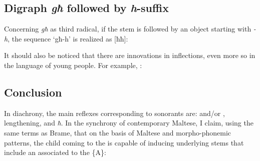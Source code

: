 \documentclass[output=paper]{langsci/langscibook}
\begin{document}
\subsection{Digraph \textit{għ} followed by \textit{h}-suffix}

Concerning \textit{għ} as third radical, if the stem is followed by an object  starting with \textit{-h}, the sequence ‘għ-h’ is realized as [ħħ]:

\ea%
\begin{xlist}
\vspace*{-5mm}
\end{xlist}
\z

It should also be noticed that there are innovations in inflections, even more so in the language of young people. For example, \citet[99]{Fabri2011}:


\puechlengths{1cm}{2cm}{4cm}{3.5cm}{1.5cm}{1.5cm}

\ea%
\label{ex:puech:55}
\begin{xlist}
\vspace*{-5mm}
\end{xlist}
\z


\subsection{Conclusion}
In diachrony, the main reflexes corresponding to   sonorants are:  and/or , lengthening, and  \textit{ħ}. In the synchrony of contemporary Maltese, I claim, using the same terms as Brame, that on the basis of Maltese  and morpho-phonemic patterns, the child coming to the  is capable of inducing underlying stems that include an  associated to the  \{A\}:  
\end{document}
